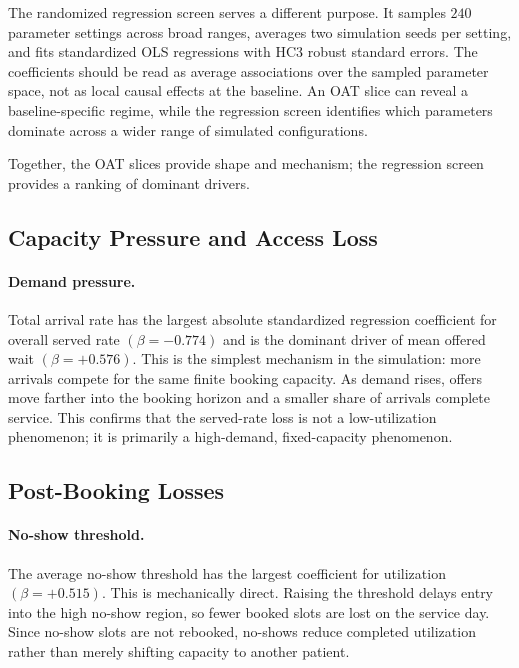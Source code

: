 \documentclass[11pt]{article}
\begin{document}
The randomized regression screen serves a different purpose. It samples
\(240\) parameter settings across broad ranges, averages two simulation seeds
per setting, and fits standardized OLS regressions with HC3 robust standard
errors. The coefficients should be read as average associations over the
sampled parameter space, not as local causal effects at the baseline. An OAT slice can reveal a baseline-specific regime, while
the regression screen identifies which parameters dominate across a wider
range of simulated configurations.

Together, the OAT slices provide shape and mechanism; the regression screen
provides a ranking of dominant drivers.

\subsection{Capacity Pressure and Access Loss}

\paragraph{Demand pressure.}
Total arrival rate has the largest absolute standardized regression
coefficient for overall served rate \((\beta=-0.774)\) and is the dominant
driver of mean offered wait \((\beta=+0.576)\). This is the simplest
mechanism in the simulation: more arrivals compete for the same finite booking
capacity. As demand rises, offers move farther into the booking horizon and a
smaller share of arrivals complete service. This confirms that the served-rate
loss is not a low-utilization phenomenon; it is primarily a high-demand,
fixed-capacity phenomenon.

\subsection{Post-Booking Losses}

\paragraph{No-show threshold.}
The average no-show threshold has the largest coefficient for utilization
\((\beta=+0.515)\). This is mechanically direct. Raising the threshold delays
entry into the high no-show region, so fewer booked slots are lost on the
service day. Since no-show slots are not rebooked, no-shows reduce completed
utilization rather than merely shifting capacity to another patient.
\end{document}
